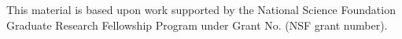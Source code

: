\documentclass{sigchi}
\begin{document}
This material is based upon work supported by the National Science Foundation
Graduate Research Fellowship Program under Grant No. (NSF grant number).

%
%
%
%
%
\balance



\end{document}
